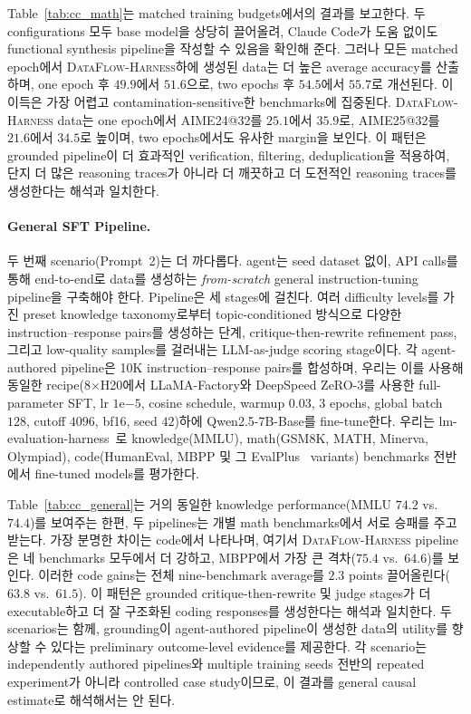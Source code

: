 

Table~\ref{tab:cc_math}는 matched training budgets에서의 결과를 보고한다. 두 configurations 모두 base model을 상당히 끌어올려, Claude Code가 도움 없이도 functional synthesis pipeline을 작성할 수 있음을 확인해 준다. 그러나 모든 matched epoch에서 \textsc{DataFlow-Harness}하에 생성된 data는 더 높은 average accuracy를 산출하며, one epoch 후 $49.9$에서 $51.6$으로, two epochs 후 $54.5$에서 $55.7$로 개선된다. 이 이득은 가장 어렵고 contamination-sensitive한 benchmarks에 집중된다. \textsc{DataFlow-Harness} data는 one epoch에서 AIME24@32를 $25.1$에서 $35.9$로, AIME25@32를 $21.6$에서 $34.5$로 높이며, two epochs에서도 유사한 margin을 보인다. 이 패턴은 grounded pipeline이 더 효과적인 verification, filtering, deduplication을 적용하여, 단지 더 많은 reasoning traces가 아니라 더 깨끗하고 더 도전적인 reasoning traces를 생성한다는 해석과 일치한다.

\FloatBarrier

\paragraph{\textbf{General SFT Pipeline.}}
두 번째 scenario(Prompt~2)는 더 까다롭다. agent는 seed dataset 없이, API calls를 통해 end-to-end로 data를 생성하는 \emph{from-scratch} general instruction-tuning pipeline을 구축해야 한다. Pipeline은 세 stages에 걸친다. 여러 difficulty levels를 가진 preset knowledge taxonomy로부터 topic-conditioned 방식으로 다양한 instruction--response pairs를 생성하는 단계, critique-then-rewrite refinement pass, 그리고 low-quality samples를 걸러내는 LLM-as-judge scoring stage이다. 각 agent-authored pipeline은 10K instruction--response pairs를 합성하며, 우리는 이를 사용해 동일한 recipe(8$\times$H20에서 LLaMA-Factory와 DeepSpeed ZeRO-3를 사용한 full-parameter SFT, lr $1\mathrm{e}{-5}$, cosine schedule, warmup $0.03$, 3 epochs, global batch $128$, cutoff $4096$, bf16, seed $42$)하에 Qwen2.5-7B-Base를 fine-tune한다. 우리는 lm-evaluation-harness~\cite{eval-harness}로 knowledge(MMLU), math(GSM8K, MATH, Minerva, Olympiad), code(HumanEval, MBPP 및 그 EvalPlus~\cite{liu2023evalplus} variants) benchmarks 전반에서 fine-tuned models를 평가한다.



Table~\ref{tab:cc_general}는 거의 동일한 knowledge performance(MMLU $74.2$ vs.\ $74.4$)를 보여주는 한편, 두 pipelines는 개별 math benchmarks에서 서로 승패를 주고받는다. 가장 분명한 차이는 code에서 나타나며, 여기서 \textsc{DataFlow-Harness} pipeline은 네 benchmarks 모두에서 더 강하고, MBPP에서 가장 큰 격차($75.4$ vs.\ $64.6$)를 보인다. 이러한 code gains는 전체 nine-benchmark average를 $2.3$ points 끌어올린다($63.8$ vs.\ $61.5$). 이 패턴은 grounded critique-then-rewrite 및 judge stages가 더 executable하고 더 잘 구조화된 coding responses를 생성한다는 해석과 일치한다. 두 scenarios는 함께, grounding이 agent-authored pipeline이 생성한 data의 utility를 향상할 수 있다는 preliminary outcome-level evidence를 제공한다. 각 scenario는 independently authored pipelines와 multiple training seeds 전반의 repeated experiment가 아니라 controlled case study이므로, 이 결과를 general causal estimate로 해석해서는 안 된다.

